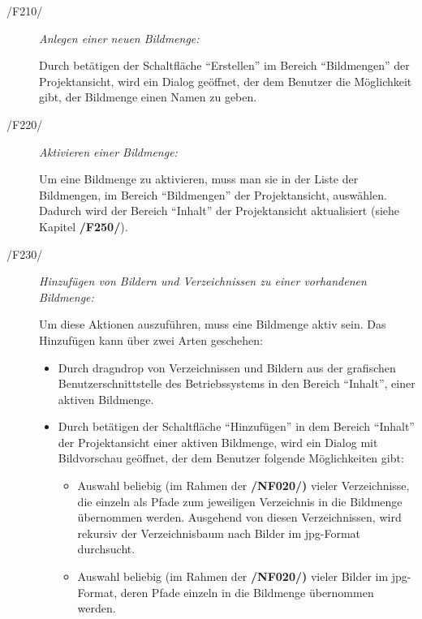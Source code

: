 	\begin{description}
		
		\item[/F210/] \textit{Anlegen einer neuen Bildmenge:}\par Durch betätigen der Schaltfläche "`Erstellen"' im Bereich "`Bildmengen"' der Projektansicht, wird ein Dialog geöffnet, der dem Benutzer die Möglichkeit gibt, der Bildmenge einen Namen zu geben.
		
		\item[/F220/] \textit{Aktivieren einer Bildmenge:}\par Um eine Bildmenge zu aktivieren, muss man sie in der Liste der Bildmengen, im Bereich "`Bildmengen"' der Projektansicht, auswählen. Dadurch wird der Bereich "`Inhalt"' der Projektansicht aktualisiert (siehe Kapitel \textbf{/F250/}).
		
		\item[/F230/] \textit{Hinzufügen von Bildern und Verzeichnissen zu einer vorhandenen Bildmenge:}\par Um diese Aktionen auszuführen, muss eine Bildmenge aktiv sein. Das Hinzufügen kann über zwei Arten geschehen:
		
			\begin{itemize}
				
				\item Durch \gls{dragndrop} von Verzeichnissen und Bildern aus der grafischen Benutzerschnittstelle des Betriebssystems in den Bereich "`Inhalt"', einer aktiven Bildmenge. 
				
				\item Durch betätigen der Schaltfläche "`Hinzufügen"' in dem Bereich "`Inhalt"' der Projektansicht einer aktiven Bildmenge, wird ein Dialog mit Bildvorschau geöffnet, der dem Benutzer folgende Möglichkeiten gibt:
				
					\begin{itemize}
			
						\item Auswahl beliebig (im Rahmen der \textbf{/NF020/)} vieler Verzeichnisse, die einzeln als Pfade zum jeweiligen Verzeichnis in die Bildmenge übernommen werden. Ausgehend von diesen Verzeichnissen, wird rekursiv der Verzeichnisbaum nach Bilder im \gls{jpg}-Format durchsucht.
						
						\item Auswahl beliebig (im Rahmen der \textbf{/NF020/)} vieler Bilder im \gls{jpg}-Format, deren Pfade einzeln in die Bildmenge übernommen werden.
					

\end{itemize}
\end{itemize}
\end{description}
